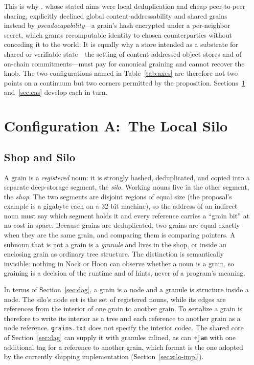 \documentclass[twoside]{article}
\begin{document}
This is why , whose stated aims were local deduplication and cheap peer-to-peer sharing, explicitly declined global content-addressability and shared grains instead by \emph{pseudocapability}---a grain's hash encrypted under a per-neighbor secret, which grants recomputable identity to chosen counterparties without conceding it to the world.  It is equally why a store intended as a substrate for shared or verifiable state---the setting of content-addressed object stores and of on-chain commitments---must pay for canonical graining and cannot recover the knob.  The two configurations named in Table~\ref{tab:axes} are therefore not two points on a continuum but two corners permitted by the proposition.  Sections~\ref{sec:silo} and~\ref{sec:cas} develop each in turn.

\section[Configuration A]{Configuration A:\ The Local Silo}
\label{sec:silo}

\subsection{Shop and Silo}

A grain is a \emph{registered} noun:  it is strongly hashed, deduplicated, and copied into a separate deep-storage segment, the \emph{silo}.  Working nouns live in the other segment, the \emph{shop}.  The two segments are disjoint regions of equal size (the proposal's example is a gigabyte each on a 32-bit machine), so the address of an indirect noun must say which segment holds it and every reference carries a ``grain bit'' at no cost in space.  Because grains are deduplicated, two grains are equal exactly when they are the same grain, and comparing them is comparing pointers.  A subnoun that is not a grain is a \emph{granule} and lives in the shop, or inside an enclosing grain as ordinary tree structure.  The distinction is semantically invisible:  nothing in Nock or Hoon can observe whether a noun is a grain, so graining is a decision of the runtime and of hints, never of a program's meaning.

In terms of Section~\ref{sec:dag}, a grain is a node and a granule is structure inside a node.  The silo's node set is the set of registered nouns, while its edges are references from the interior of one grain to another grain.  To serialize a grain is therefore to write its interior as a tree and each reference to another grain as a node reference.  \texttt{grains.txt} does not specify the interior codec.  The shared core of Section~\ref{sec:dag} can supply it with granules inlined, as can \texttt{+jam} with one additional tag for a reference to another grain, which format is the one adopted by the currently shipping implementation (Section~\ref{sec:silo-impl}).
\end{document}
